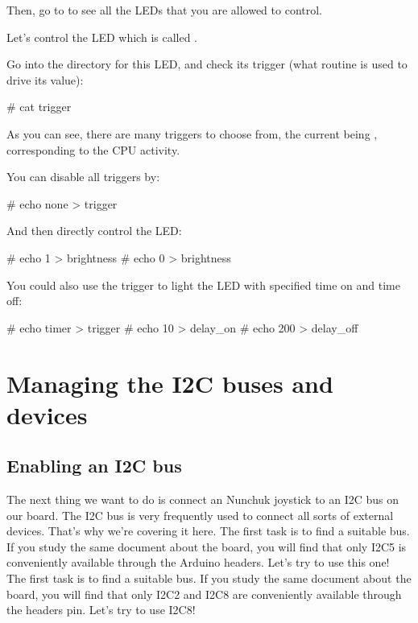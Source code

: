 Then, go to  to see all the LEDs that you are allowed
to control.

Let's control the LED which is called
.

Go into the directory for this LED, and check its trigger (what
routine is used to drive its value):

\begin{bashinput}
# cat trigger
\end{bashinput}

As you can see, there are many triggers to choose from, the current
being , corresponding to the CPU activity.

You can disable all triggers by:

\begin{bashinput}
# echo none > trigger
\end{bashinput}

And then directly control the LED:

\begin{bashinput}
# echo 1 > brightness
# echo 0 > brightness
\end{bashinput}

You could also use the  trigger to light the LED
with specified time on and time off:

\begin{bashinput}
# echo timer > trigger
# echo 10 > delay_on
# echo 200 > delay_off
\end{bashinput}

\section{Managing the I2C buses and devices}

\subsection{Enabling an I2C bus}

The next thing we want to do is connect an Nunchuk joystick
to an I2C bus on our board. The I2C bus is very frequently used
to connect all sorts of external devices. That's why we're covering
it here.
\if{}
The first task is to find a suitable bus. If you study the
same document about the board, you will find that only I2C5 is
conveniently available through the Arduino headers. Let's try
to use this one!
\fi
\if{}
The first task is to find a suitable bus. If you study the
same document about the board, you will find that only I2C2 and I2C8 are
conveniently available through the headers pin. Let's try
to use I2C8!
\fi

